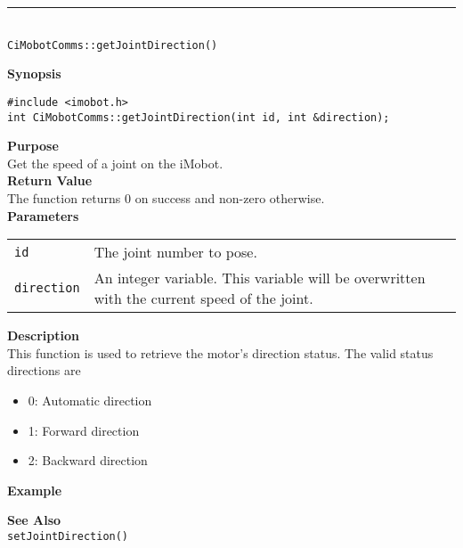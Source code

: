 \noindent
\vspace{5pt}
\rule{4.5in}{0.015in}\\
\noindent
{\LARGE \texttt{CiMobotComms::getJointDirection()}}\\
{}

\noindent
{\bf Synopsis}\\
\begin{verbatim}
#include <imobot.h>
int CiMobotComms::getJointDirection(int id, int &direction);
\end{verbatim}

\noindent
{\bf Purpose}\\
Get the speed of a joint on the iMobot.\\

\noindent
{\bf Return Value}\\
The function returns 0 on success and non-zero otherwise.\\

\noindent
{\bf Parameters}
\vspace{-0.1in}
\begin{description}
\item               
\begin{tabular}{p{10 mm}p{145 mm}}
\texttt{id} & The joint number to pose. \\
\texttt{direction} & An integer variable. This variable will be overwritten
with the current speed of the joint.
\end{tabular}
\end{description}

\noindent
{\bf Description}\\
This function is used to retrieve the motor's direction status. The valid
status directions are
\begin{itemize}
\item 0: Automatic direction
\item 1: Forward direction
\item 2: Backward direction
\end{itemize}

\noindent
{\bf Example}\\
\noindent

\noindent
{\bf See Also}\\
\texttt{setJointDirection()}

